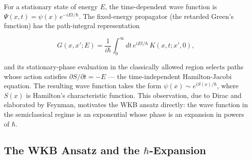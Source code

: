For a stationary state of energy $E$, the time-dependent wave function is $\Psi(x,t) = \psi(x)\,e^{-iEt/\hbar}$. The fixed-energy propagator (the retarded Green's function) has the path-integral representation
\begin{linenomath}
\begin{equation}
G(x,x';E) = \frac{1}{i\hbar}\int_0^\infty dt\,e^{iEt/\hbar}\,K(x,t;x',0),
\end{equation}
\end{linenomath}
and its stationary-phase evaluation in the classically allowed region selects paths whose action satisfies $\partial S/\partial t = -E$ --- the time-independent Hamilton-Jacobi equation. The resulting wave function takes the form $\psi(x) \sim e^{iS(x)/\hbar}$, where $S(x)$ is Hamilton's characteristic function. This observation, due to Dirac and elaborated by Feynman, motivates the WKB ansatz directly: the wave function in the semiclassical regime is an exponential whose phase is an expansion in powers of $\hbar$.

\subsection{The WKB Ansatz and the $\hbar$-Expansion}

